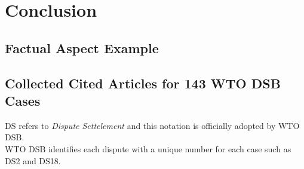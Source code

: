 \documentclass[12pt,letterpaper]{article}
\begin{document}


\section{Conclusion}





\begin{appendices}
  \section{}
  \label{sec:appendix}


  \subsection{Factual Aspect Example}
  \label{sub:factual-aspect-example}
  



  \subsection{Collected Cited Articles for 143 WTO DSB Cases}
  DS refers to \textit{Dispute Settelement} and this notation is officially adopted by WTO DSB.\\
  WTO DSB identifies each dispute with a unique number for each case such as DS2 and DS18.
  \label{sub:cited-articles-table}
  



\end{appendices}
\end{document}
